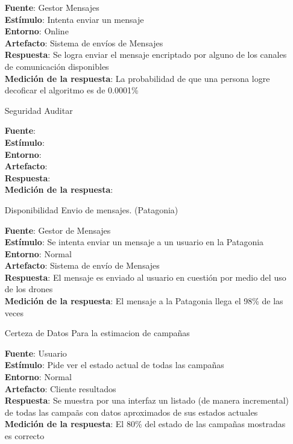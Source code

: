 \documentclass[a4paper, 11pt]{article}
\begin{document}
\begin{itemize}
\textbf{Fuente}: Gestor Mensajes\\
\textbf{Estímulo}: Intenta enviar un mensaje\\
\textbf{Entorno}: Online \\
\textbf{Artefacto}: Sistema de env\'ios de Mensajes\\
\textbf{Respuesta}: Se logra enviar el mensaje encriptado por alguno de los canales de comunicaci\'on disponibles \\
\textbf{Medición de la respuesta}: La probabilidad de que una persona logre decoficar el algoritmo es de 0.0001\% \\

\item[Seguridad] Auditar

\textbf{Fuente}: \\
\textbf{Estímulo}: \\
\textbf{Entorno}: \\
\textbf{Artefacto}: \\
\textbf{Respuesta}: \\
\textbf{Medición de la respuesta}: \\

\item[Disponibilidad] Envio de mensajes. (Patagonia)


\textbf{Fuente}: Gestor de Mensajes \\
\textbf{Estímulo}: Se intenta enviar un mensaje a un usuario en la Patagonia \\
\textbf{Entorno}: Normal \\
\textbf{Artefacto}: Sistema de env\'io de Mensajes \\
\textbf{Respuesta}: El mensaje es enviado al usuario en cuesti\'on por medio del uso de los drones \\
\textbf{Medición de la respuesta}: El mensaje a la Patagonia llega el 98\% de las veces \\


\item[Certeza de Datos] Para la estimacion de campa\~nas

\textbf{Fuente}: Usuario \\
\textbf{Estímulo}: Pide ver el estado actual de todas las campa\~nas \\
\textbf{Entorno}: Normal \\
\textbf{Artefacto}: Cliente resultados \\
\textbf{Respuesta}: Se muestra por una interfaz un listado (de manera incremental) de todas las campa\~as con datos aproximados de sus estados actuales \\
\textbf{Medición de la respuesta}: El 80\% del estado de las campa\~nas mostradas es correcto \\


\end{itemize}
\end{document}
